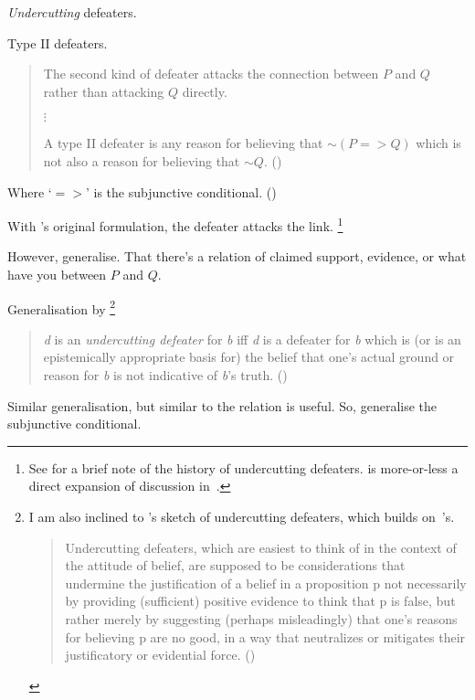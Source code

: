 \begin{note}
  \emph{Undercutting} defeaters.

  Type II defeaters.

  \begin{quote}
    The second kind of defeater attacks the connection between \(P\) and \(Q\) rather than attacking \(Q\) directly.

    \mbox{}\hfill\(\vdots\)\hfill\mbox{}

    A type II defeater is any reason for believing that \({\sim}(P => Q)\) which is not also a reason for believing that \({\sim}Q\).\nolinebreak
    \mbox{}\hfill\mbox{(\cite[43]{Pollock:1974uk})}
  \end{quote}
  Where `\(=>\)' is the subjunctive conditional. (\Citeyear[42]{Pollock:1974uk})

  With \citeauthor{Pollock:1974uk}'s original formulation, the defeater attacks the link.\nolinebreak
  \footnote{
    See \textcite[196,fn.166]{Pollock:1999tm} for a brief note of the history of undercutting defeaters.
    \textcite{Pollock:1974uk} is more-or-less a direct expansion of discussion in~\textcite{Pollock:1970un}.
  }

  However, generalise.
  That there's a relation of claimed support, evidence, or what have you between \(P\) and \(Q\).

  Generalisation by \citeauthor{Bergmann:2005ws}\nolinebreak
  \footnote{
    I am also inclined to \citeauthor{Worsnip:2018aa}'s sketch of undercutting defeaters, which builds on~\citeauthor{Bergmann:2005ws}'s.
    \begin{quote}
      Undercutting defeaters, which are easiest to think of in the context of the attitude of belief, are supposed to be considerations that undermine the justification of a belief in a proposition p not necessarily by providing (sufficient) positive evidence to think that p is false, but rather merely by suggesting (perhaps misleadingly) that one’s reasons for believing p are no good, in a way that neutralizes or mitigates their justificatory or evidential force.\linebreak
      \mbox{}\hfill\mbox{(\Citeyear[29]{Worsnip:2018aa})}
    \end{quote}
  }
  \begin{quote}
    \emph{d} is an \emph{undercutting defeater} for \emph{b} iff \emph{d} is a defeater for \emph{b} which is (or is an epistemically appropriate basis for) the belief that one's actual ground or reason for \emph{b} is not indicative of \emph{b}'s truth.\newline
    \mbox{}\hfill\mbox{(\citeyear[424]{Bergmann:2005ws})}
  \end{quote}

  Similar generalisation, but similar to \citeauthor{Pollock:1974uk} the relation is useful.
  So, generalise the subjunctive conditional.
\end{note}

